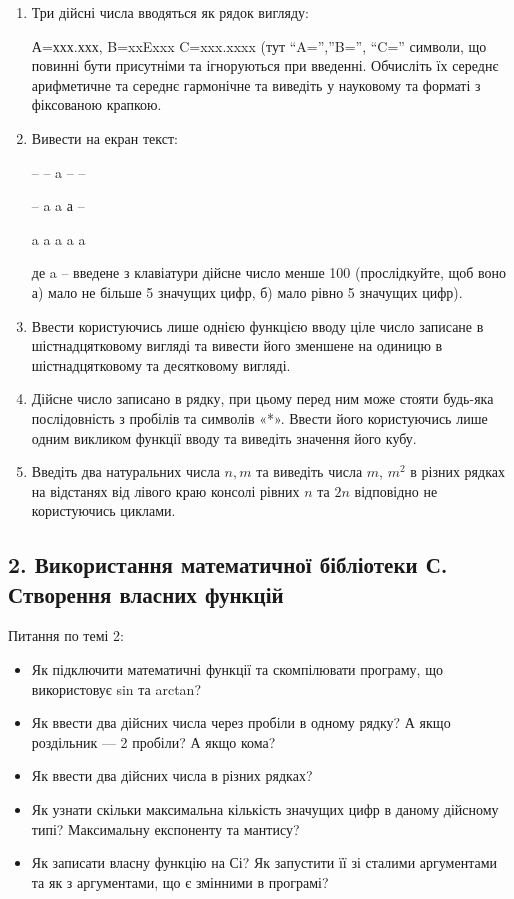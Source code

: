 \documentclass[]{article}
\begin{document}
\begin{enumerate}
\def\labelenumi{\arabic{enumi}.}
\setcounter{enumi}{19}
\item
  Три дійсні числа вводяться як рядок вигляду:

А=ххх.ххх, B=xxExxx C=xxx.xxxx (тут ``A='',''B='', ``C='' символи, що
повинні бути присутніми та ігноруються при введенні. Обчисліть їх
середнє арифметичне та середнє гармонічне та виведіть у науковому та
форматі з фіксованою крапкою.

\item
  Вивести на екран текст:

-- \textbar{} -- \textbar{} a \textbar{} -- \textbar{} --

-- \textbar{} a \textbar{} a \textbar{} а \textbar{} --

a \textbar{} a \textbar{} a \textbar{} a \textbar{} a

де a -- введене з клавіатури дійсне число менше 100 (прослідкуйте, щоб
воно а) мало не більше 5 значущих цифр, б) мало рівно 5 значущих цифр).

\item
Ввести користуючись лише однією функцією вводу ціле число записане в шістнадцятковому вигляді та вивести його зменшене на одиницю в  шістнадцятковому та десятковому вигляді.

\item
Дійсне число записано в рядку, при цьому перед ним може стояти будь-яка послідовність з пробілів та символів «*». Ввести його  користуючись лише одним викликом функції вводу та виведіть значення його кубу.

\item
Введіть два натуральних числа $n, m$ та виведіть числа $m$, $m^{2}$ в різних рядках
 на відстанях від лівого краю консолі рівних $n$ та $2n$ відповідно не користуючись циклами.

\end{enumerate}


\newpage
\subsection{ 2. Використання математичної бібліотеки С. Створення власних функцій }
\setcounter{subsection}{1}

Питання по темі 2:

\begin{itemize}
\item
  Як підключити математичні функції та скомпілювати програму, що
  використовує sin та arctan?
\item
  Як ввести два дійсних числа через пробіли в одному рядку? А якщо
  роздільник --- 2 пробіли? А якщо кома?
\item
  Як ввести два дійсних числа в різних рядках?
\item
  Як узнати скільки максимальна кількість значущих цифр в даному
  дійсному типі? Максимальну експоненту та мантису?
\item
  Як записати власну функцію на Сі? Як запустити її зі сталими
  аргументами та як з аргументами, що є змінними в програмі?
\end{itemize}
\end{document}
